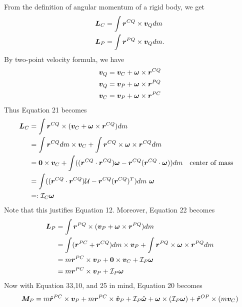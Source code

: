 \documentclass[12pt]{article}
\begin{document}
\begin{problem}[3]
From the definition of angular momentum of a rigid body, we get
\begin{align}
	{\bm{ L}}_C &= \int {\bm{ r}}^{CQ} \times {\bm{ v}}_Q dm \\  
	{\bm{ L}}_P &= \int {\bm{ r}}^{PQ} \times {\bm{ v}}_Q dm .
\end{align}
By two-point velocity formula, we have
\begin{align}
	{\bm{ v}}_Q &= {\bm{ v}}_C + {\bm{ \omega}} \times {\bm{ r}}^{CQ}   \\ 
	{\bm{ v}}_Q &= {\bm{ v}}_P + {\bm{ \omega}} \times {\bm{ r}}^{PQ}   \\
	{\bm{ v}}_C &= {\bm{ v}}_P + {\bm{ \omega}} \times {\bm{ r}}^{PC}   
\end{align}
Thus Equation 21 becomes
\begin{align}
	{\bm{ L}}_C &= \int {\bm{ r}}^{CQ} \times ( {\bm{ v}}_C + {\bm{ \omega}} \times {\bm{ r}}^{CQ} )dm  \\
	&= \int {\bm{ r}}^{CQ} dm \times {\bm{ v}}_C + \int {\bm{ r}}^{CQ} \times {\bm{ \omega}} \times {\bm{ r}}^{CQ} dm      \\
	&= {\bm{ 0}} \times {\bm{ v}}_C + \int ( ({\bm{ r}}^{CQ} \cdot  {\bm{ r}}^{CQ}) {\bm{ \omega}} - {\bm{ r}}^{CQ}( {\bm{ r}}^{CQ} \cdot {\bm{ \omega}} ) )dm     && \text{center of mass}  \\
	&= \int (({\bm{ r}}^{CQ} \cdot {\bm{ r}}^{CQ}) \mathcal{ U} - {\bm{ r}}^{CQ} ({\bm{ r}}^{CQ})^{T} )dm\ {\bm{ \omega}}    \\
	&=: \mathcal{ I}_C {\bm{ \omega}} 
\end{align}
Note that this justifies Equation 12. Moreover, Equation 22 becomes
\begin{align}
	{\bm{ L}}_P &= \int {\bm{ r}}^{PQ} \times ( {\bm{ v}}_P + {\bm{ \omega}} \times {\bm{ r}}^{PQ} )dm  \\
	&= \int ({\bm{ r}}^{PC}+ {\bm{ r}}^{CQ})  dm \times {\bm{ v}}_P + \int {\bm{ r}}^{PQ} \times {\bm{ \omega}} \times {\bm{ r}}^{PQ} dm      \\
	&= m {\bm{ r}}^{PC} \times {\bm{ v}}_P + {\bm{ 0}} \times {\bm{ v}}_C + \mathcal{ I}_P {\bm{ \omega}} \\
	&= m {\bm{ r}}^{PC} \times {\bm{ v}}_P + \mathcal{ I}_P {\bm{ \omega}} 
\end{align}
Now with Equation 33,10, and 25 in mind, Equation 20 becomes
\begin{align}
	\ve{ M}_P &= m \ve{ \dot{r}}^{PC} \times \ve{ v}_P + m \ve{ r}^{PC} \times \ve{ \dot{v}}_P + \mathcal{ I}_P \ve{ \dot{\omega}} + \ve{ \omega} \times (\mathcal{ I}_P \ve{ \omega})    + \ve{ \dot{r}}^{OP} \times (m\ve{ v}_C) \\

\end{align}
\end{problem}
\end{document}
